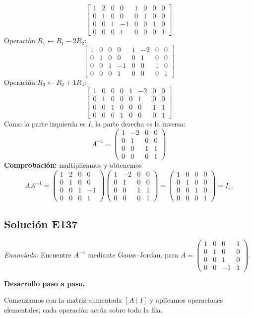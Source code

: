 \documentclass[12pt]{article}
\theoremstyle{remark}
\newcommand{\solucion}[2]{\Needspace{11\baselineskip}\subsection*{Solución E#1}\noindent\textit{Enunciado:} #2\par\medskip\noindent\textbf{Desarrollo paso a paso.}\par\medskip}
\begin{document}
\[
\left[\begin{array}{rrrr|rrrr}1&2&0&0&1&0&0&0\\0&1&0&0&0&1&0&0\\0&0&1&-1&0&0&1&0\\0&0&0&1&0&0&0&1\end{array}\right]
\]
Operación $R_{1}\leftarrow R_{1}-2R_{2}$:
\[
\left[\begin{array}{rrrr|rrrr}1&0&0&0&1&-2&0&0\\0&1&0&0&0&1&0&0\\0&0&1&-1&0&0&1&0\\0&0&0&1&0&0&0&1\end{array}\right]
\]
Operación $R_{3}\leftarrow R_{3}+1R_{4}$:
\[
\left[\begin{array}{rrrr|rrrr}1&0&0&0&1&-2&0&0\\0&1&0&0&0&1&0&0\\0&0&1&0&0&0&1&1\\0&0&0&1&0&0&0&1\end{array}\right]
\]
Como la parte izquierda es $I$, la parte derecha es la inversa:
\[
\boxed{A^{-1}=\begin{pmatrix}1&-2&0&0\\0&1&0&0\\0&0&1&1\\0&0&0&1\end{pmatrix}}
\]
\textbf{Comprobación:} multiplicamos y obtenemos
\[
AA^{-1}=\begin{pmatrix}1&2&0&0\\0&1&0&0\\0&0&1&-1\\0&0&0&1\end{pmatrix}\begin{pmatrix}1&-2&0&0\\0&1&0&0\\0&0&1&1\\0&0&0&1\end{pmatrix}=\begin{pmatrix}1&0&0&0\\0&1&0&0\\0&0&1&0\\0&0&0&1\end{pmatrix}=I_{4}.
\]

\medskip

\solucion{137}{Encuentre $A^{-1}$ mediante Gauss--Jordan, para $A=\begin{pmatrix}1&0&0&1\\0&1&0&0\\0&0&1&0\\0&0&-1&1\end{pmatrix}$.}
Comenzamos con la matriz aumentada $[A\mid I]$ y aplicamos operaciones elementales; cada operación actúa sobre toda la fila.
\end{document}

